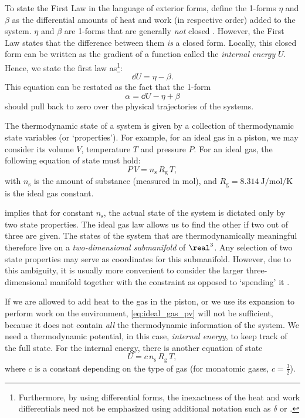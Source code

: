 To state the First Law in the language of exterior forms, define the 1-forms $\eta$ and $\beta$ as the differential amounts of heat and work (in respective order) added to the system. $\eta$ and $\beta$ are 1-forms that are generally \emph{not} closed \cite{Bamberg1988,Frankel2012}. However, the First Law states that the difference between them \emph{is} a closed form. Locally, this closed form  can be written as the gradient of a function called the \emph{internal energy} $U$. Hence, we state the first law as\footnote{Furthermore, by using differential forms, the inexactness of the heat and work differentials need not be emphasized using additional notation such as $\delta$ or \dj.}:
\begin{equation}
    \dd{U} = \eta - \beta.
    \label{eq:thermo_first_law}
\end{equation}
This equation can be restated as the fact that the 1-form
$$ \alpha = \dd{U} - \eta + \beta $$
should pull back to zero over the physical trajectories of the systems.

The thermodynamic state of a system is given by a collection of thermodynamic state variables (or `properties'). For example, for an ideal gas in a piston, we may consider its volume $V$, temperature $T$ and pressure $P$. For an ideal gas, the following equation of state must hold:
\begin{equation}
    P \, V = n_\text{s} \, R_\text{g} \, T,
    \label{eq:ideal_gas_pv}
\end{equation}
with $n_\text{s}$ is the amount of substance (measured in \si{\mole}), and $R_\text{g} = \SI{8.314}{\joule \per \mole \per \kelvin}$ is the ideal gas constant.  

 implies that for constant $n_\text{s}$, the actual state of the system is dictated only by two state properties. The ideal gas law allows us to find the other if two out of three are given. The states of the system that are thermodynamically meaningful therefore live on a \emph{two-dimensional submanifold} of $\real^3$. Any selection of two state properties may serve as coordinates for this submanifold. However, due to this ambiguity, it is usually more convenient to consider the larger three-dimensional manifold together with the constraint as opposed to `spending' it \cite{Balian2001, Giancoli2014}.

If we are allowed to add heat to the gas in the piston, or we use its expansion to perform work on the environment, \cref{eq:ideal_gas_pv} will not be sufficient, because it does not contain \emph{all} the thermodynamic information of the system. We need a thermodynamic potential, in this case, \emph{internal energy}, to keep track of the full state. For the internal energy, there is another equation of state \cite{Callen1985}
\begin{equation}
    U = c\, n_\text{s}\, R_\text{g}\, T,
    \label{eq:ideal_gas_U}
\end{equation}
where $c$ is a constant depending on the type of gas (for monatomic gases, $c = \tfrac{3}{2}$).

